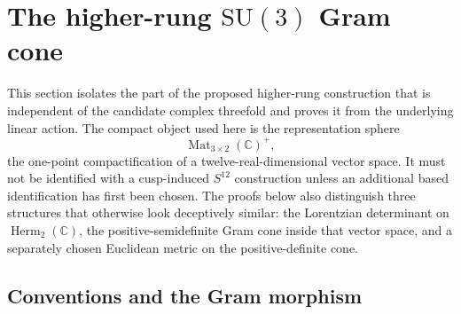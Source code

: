 \section{The higher-rung \texorpdfstring{\(\mathrm{SU}(3)\)}{SU(3)} Gram cone}
\label{sec:higher-rung-su3-gram-cone}

This section isolates the part of the proposed higher-rung construction that
is independent of the candidate complex threefold and proves it from the
underlying linear action.  The compact object used here is the representation
sphere
\[
 \operatorname{Mat}_{3\times2}(\mathbb C)^+,
\]
the one-point compactification of a twelve-real-dimensional vector space.
It must not be identified with a cusp-induced \(S^{12}\) construction unless
an additional based identification has first been chosen.  The proofs below
also distinguish three structures that otherwise look deceptively similar:
the Lorentzian determinant on \(\operatorname{Herm}_2(\mathbb C)\), the
positive-semidefinite Gram cone inside that vector space, and a separately
chosen Euclidean metric on the positive-definite cone.

\subsection{Conventions and the Gram morphism}


